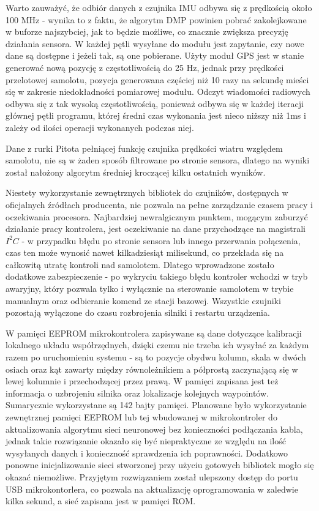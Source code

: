 \documentclass[12pt, a4paper]{article}
\begin{document}
Warto zauważyć, że odbiór danych z czujnika IMU odbywa się z prędkością około 100 MHz - wynika to z faktu, że algorytm DMP powinien pobrać zakolejkowane w buforze najszybciej, jak to będzie możliwe, co znacznie zwiększa precyzję działania sensora. W każdej pętli wysyłane do modułu jest zapytanie, czy nowe dane są dostępne i jeżeli tak, są one pobierane. Użyty moduł GPS jest w stanie generować nową pozycję z częstotliwością do 25 Hz, jednak przy prędkości przelotowej samolotu, pozycja generowana częściej niż 10 razy na sekundę mieści się w zakresie niedokładności pomiarowej modułu. Odczyt wiadomości radiowych odbywa się z tak wysoką częstotliwością, ponieważ odbywa się w każdej iteracji głównej pętli programu, której średni czas wykonania jest nieco niższy niż 1ms i zależy od ilości operacji wykonanych podczas niej.


Dane z rurki Pitota pełniącej funkcję czujnika prędkości wiatru względem samolotu, nie są w żaden sposób filtrowane po stronie sensora, dlatego na wyniki został nałożony algorytm średniej kroczącej kilku ostatnich wyników.

Niestety wykorzystanie zewnętrznych bibliotek do czujników, dostępnych w oficjalnych źródłach producenta, nie pozwala na pełne zarządzanie czasem pracy i oczekiwania procesora. Najbardziej newralgicznym punktem, mogącym zaburzyć działanie pracy kontrolera, jest oczekiwanie na dane przychodzące na magistrali $I^2C$ - w przypadku błędu po stronie sensora lub innego przerwania połączenia, czas ten może wynosić nawet kilkadziesiąt milisekund, co przekłada się na całkowitą utratę kontroli nad samolotem. Dlatego wprowadzone zostało dodatkowe zabezpieczenie - po wykryciu takiego błędu kontroler wchodzi w tryb awaryjny, który pozwala tylko i wyłącznie na sterowanie samolotem w trybie manualnym oraz odbieranie komend ze stacji bazowej. Wszystkie czujniki pozostają wyłączone do czasu rozbrojenia silniki i restartu urządzenia.

W pamięci EEPROM mikrokontrolera zapisywane są dane dotyczące kalibracji lokalnego  układu współrzędnych, dzięki czemu nie trzeba ich wysyłać za każdym razem po uruchomieniu systemu - są to pozycje obydwu kolumn, skala w dwóch osiach oraz kąt zawarty między równoleżnikiem a półprostą zaczynającą się w lewej kolumnie i przechodzącej przez prawą. W pamięci zapisana jest też informacja o uzbrojeniu silnika oraz lokalizacje kolejnych waypointów. Sumarycznie wykorzystane są 142 bajty pamięci. Planowane było wykorzystanie zewnętrznej pamięci EEPROM lub tej wbudowanej w mikrokontroler do aktualizowania algorytmu sieci neuronowej bez konieczności podłączania kabla, jednak takie rozwiązanie okazało się być niepraktyczne ze względu na ilość wysyłanych danych i konieczność sprawdzenia ich poprawności. Dodatkowo ponowne inicjalizowanie sieci stworzonej przy użyciu gotowych bibliotek mogło się okazać niemożliwe. Przyjętym rozwiązaniem został ulepszony dostęp do portu USB mikrokontorlera, co pozwala na aktualizację oprogramowania w zaledwie kilka sekund, a sieć zapisana jest w pamięci ROM.
\end{document}
